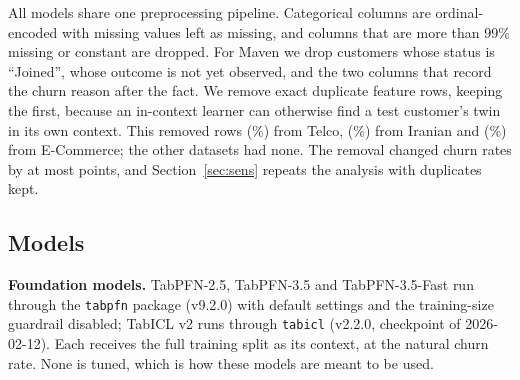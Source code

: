\documentclass[11pt]{article}
\begin{document}
\begin{table}[t]
\caption{Datasets after preprocessing. Dup.: exact duplicate feature rows removed. e-Prof.: tenure and monthly revenue
available for e-Profits.}
\label{tab:data}
\centering\small
{}
\end{table}

All models share one preprocessing pipeline. Categorical columns are ordinal-encoded with missing values left as
missing, and columns that are more than 99\% missing or constant are dropped. For Maven we drop customers whose status
is ``Joined'', whose outcome is not yet observed, and the two columns that record the churn reason after the fact. We
remove exact duplicate feature rows, keeping the first, because an in-context learner can otherwise find a test
customer's twin in its own context. This removed \dupTelco{} rows (\dupPctTelco\%) from Telco, \dupIranian{}
(\dupPctIranian\%) from Iranian and \dupECommerce{} (\dupPctECommerce\%) from E-Commerce; the other datasets had none.
The removal changed churn rates by at most \maxChurnShift{} points, and Section~\ref{sec:sens} repeats the analysis with duplicates
kept.

\subsection{Models}
\textbf{Foundation models.} TabPFN-2.5, TabPFN-3.5 and TabPFN-3.5-Fast run through the \texttt{tabpfn} package (v9.2.0)
with default settings and the training-size guardrail disabled; TabICL v2 runs through \texttt{tabicl} (v2.2.0,
checkpoint of 2026-02-12). Each receives the full training split as its context, at the natural churn rate. None is
tuned, which is how these models are meant to be used.
\end{document}
